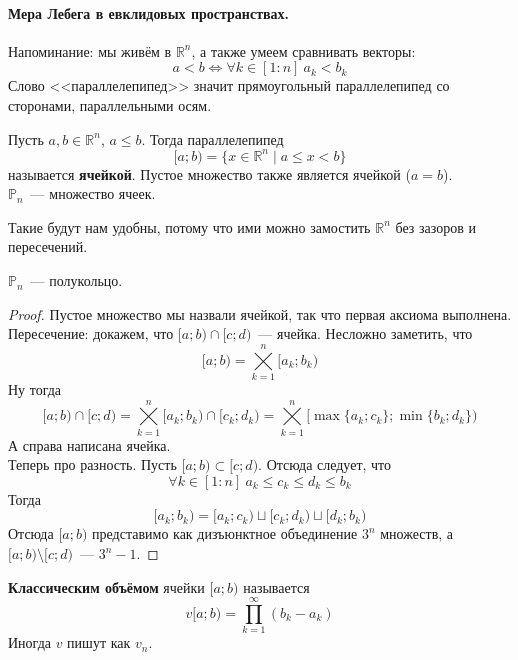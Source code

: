 \documentclass{article}
\begin{document}
    \paragraph{Мера Лебега в евклидовых пространствах.}
    \begin{remark}
        Напоминание: мы живём в $\mathbb R^n$, а также умеем сравнивать векторы:
        $$
        a<b\Leftrightarrow\forall k\in[1:n]~a_k<b_k
        $$
        Слово <<параллелепипед>> значит прямоугольный параллелепипед со сторонами, параллельными осям.
    \end{remark}
    \begin{definition}
        Пусть $a,b\in\mathbb R^n$, $a\leqslant b$. Тогда параллелепипед
        $$[a;b)=\{x\in\mathbb R^n\mid a\leqslant x<b\}$$
        называется \textbf{ячейкой}. Пустое множество также является ячейкой ($a=b$).\\
        $\mathbb P_n$~--- множество ячеек.
    \end{definition}
    \begin{remark}
        Такие будут нам удобны, потому что ими можно замостить $\mathbb R^n$ без зазоров и пересечений.
    \end{remark}
    \begin{lemma}
        $\mathbb P_n$~--- полукольцо.
    \end{lemma}
    \begin{proof}
        Пустое множество мы назвали ячейкой, так что первая аксиома выполнена.\\
        Пересечение: докажем, что $[a;b)\cap[c;d)$~--- ячейка. Несложно заметить, что
        $$
        [a;b)=\bigtimes\limits_{k=1}^n[a_k;b_k)
        $$
        Ну тогда
        $$
        [a;b)\cap[c;d)=\bigtimes\limits_{k=1}^n[a_k;b_k)\cap[c_k;d_k)=\bigtimes\limits_{k=1}^n[\max\{a_k;c_k\};\min\{b_k;d_k\})
        $$
        А справа написана ячейка.\\
        Теперь про разность. Пусть $[a;b)\subset[c;d)$. Отсюда следует, что
        $$
        \forall k\in[1:n]~a_k\leqslant c_k\leqslant d_k\leqslant b_k
        $$
        Тогда
        $$
        [a_k;b_k)=[a_k;c_k)\sqcup[c_k;d_k)\sqcup[d_k;b_k)
        $$
        Отсюда $[a;b)$ представимо как дизъюнктное объединение $3^n$ множеств, а $[a;b)\setminus[c;d)$~--- $3^n-1$.
    \end{proof}
    \begin{definition}
        \textbf{Классическим объёмом} ячейки $[a;b)$ называется
        $$v[a;b)=\prod\limits_{k=1}^\infty(b_k-a_k)$$
        Иногда $v$ пишут как $v_n$.
    \end{definition}
\end{document}
